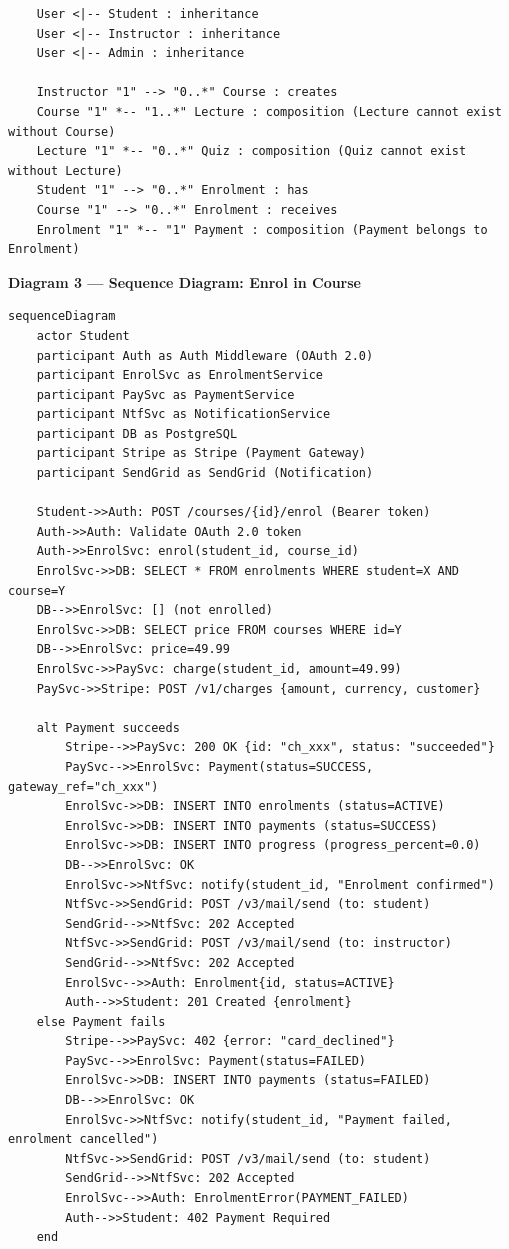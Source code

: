 \documentclass[11pt,a4paper]{book}
\begin{document}
\begin{lstlisting}
    User <|-- Student : inheritance
    User <|-- Instructor : inheritance
    User <|-- Admin : inheritance

    Instructor "1" --> "0..*" Course : creates
    Course "1" *-- "1..*" Lecture : composition (Lecture cannot exist without Course)
    Lecture "1" *-- "0..*" Quiz : composition (Quiz cannot exist without Lecture)
    Student "1" --> "0..*" Enrolment : has
    Course "1" --> "0..*" Enrolment : receives
    Enrolment "1" *-- "1" Payment : composition (Payment belongs to Enrolment)
\end{lstlisting}

\medskip

\textbf{Diagram 3 --- Sequence Diagram: Enrol in Course}

\begin{lstlisting}
sequenceDiagram
    actor Student
    participant Auth as Auth Middleware (OAuth 2.0)
    participant EnrolSvc as EnrolmentService
    participant PaySvc as PaymentService
    participant NtfSvc as NotificationService
    participant DB as PostgreSQL
    participant Stripe as Stripe (Payment Gateway)
    participant SendGrid as SendGrid (Notification)

    Student->>Auth: POST /courses/{id}/enrol (Bearer token)
    Auth->>Auth: Validate OAuth 2.0 token
    Auth->>EnrolSvc: enrol(student_id, course_id)
    EnrolSvc->>DB: SELECT * FROM enrolments WHERE student=X AND course=Y
    DB-->>EnrolSvc: [] (not enrolled)
    EnrolSvc->>DB: SELECT price FROM courses WHERE id=Y
    DB-->>EnrolSvc: price=49.99
    EnrolSvc->>PaySvc: charge(student_id, amount=49.99)
    PaySvc->>Stripe: POST /v1/charges {amount, currency, customer}

    alt Payment succeeds
        Stripe-->>PaySvc: 200 OK {id: "ch_xxx", status: "succeeded"}
        PaySvc-->>EnrolSvc: Payment(status=SUCCESS, gateway_ref="ch_xxx")
        EnrolSvc->>DB: INSERT INTO enrolments (status=ACTIVE)
        EnrolSvc->>DB: INSERT INTO payments (status=SUCCESS)
        EnrolSvc->>DB: INSERT INTO progress (progress_percent=0.0)
        DB-->>EnrolSvc: OK
        EnrolSvc->>NtfSvc: notify(student_id, "Enrolment confirmed")
        NtfSvc->>SendGrid: POST /v3/mail/send (to: student)
        SendGrid-->>NtfSvc: 202 Accepted
        NtfSvc->>SendGrid: POST /v3/mail/send (to: instructor)
        SendGrid-->>NtfSvc: 202 Accepted
        EnrolSvc-->>Auth: Enrolment{id, status=ACTIVE}
        Auth-->>Student: 201 Created {enrolment}
    else Payment fails
        Stripe-->>PaySvc: 402 {error: "card_declined"}
        PaySvc-->>EnrolSvc: Payment(status=FAILED)
        EnrolSvc->>DB: INSERT INTO payments (status=FAILED)
        DB-->>EnrolSvc: OK
        EnrolSvc->>NtfSvc: notify(student_id, "Payment failed, enrolment cancelled")
        NtfSvc->>SendGrid: POST /v3/mail/send (to: student)
        SendGrid-->>NtfSvc: 202 Accepted
        EnrolSvc-->>Auth: EnrolmentError(PAYMENT_FAILED)
        Auth-->>Student: 402 Payment Required
    end
\end{lstlisting}
\end{document}
